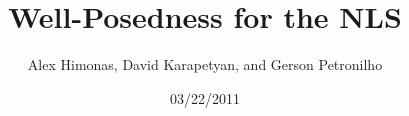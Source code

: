 \documentclass[12pt,reqno]{amsart}
\numberwithin{equation}{section}  %
\begin{document}
\title{Well-Posedness for the NLS}
\author{Alex Himonas, David Karapetyan, and Gerson Petronilho}
\address{Department of Mathematics  \\
University  of Notre Dame\\
Notre Dame, IN 46556 }
\address{Department of Mathematics \\
University  of Notre Dame\\
Notre Dame, IN 46556 }
\address{Departamento de Matemática \\
Universidade Federal de São
Carlos \\
Rodovia Washington Luiz, Km 235, São Carlos, SP,
13565-905, Brasil}
        \date{03/22/2011}
        \maketitle
\end{document}
